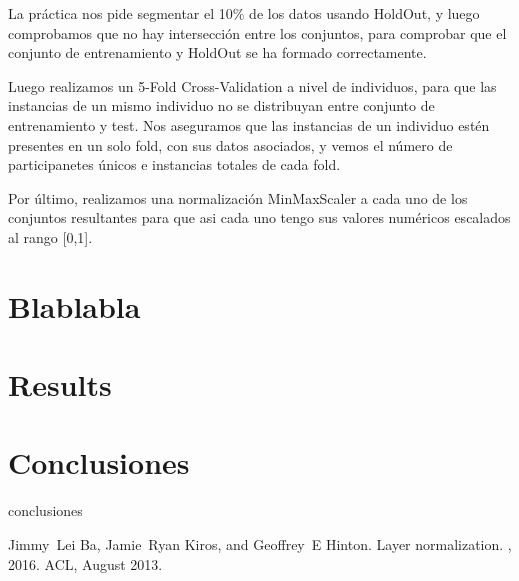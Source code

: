 \documentclass{article}
\begin{document}
La práctica nos pide segmentar el 10\% de los datos usando HoldOut, y luego comprobamos que no hay intersección entre los conjuntos, para comprobar que el conjunto de entrenamiento y HoldOut se ha formado correctamente. 

Luego realizamos un 5-Fold Cross-Validation a nivel de individuos, para que las instancias de un mismo individuo no se distribuyan entre conjunto de entrenamiento y test. Nos aseguramos que las instancias de un individuo estén presentes en un solo fold, con sus datos asociados, y vemos el número de participanetes únicos e instancias totales de cada fold.

Por último, realizamos una normalización MinMaxScaler a cada uno de los conjuntos resultantes para que asi cada uno tengo sus valores numéricos escalados al rango [0,1].
	\section{Blablabla}
	
	
	\section{Results} 
	
	
	\section{Conclusiones}
	
	conclusiones
	
	
	\begin{thebibliography}{10}
		
		Jimmy~Lei Ba, Jamie~Ryan Kiros, and Geoffrey~E Hinton.
		\newblock Layer normalization.
		, 2016.
		ACL, August 2013.
		
	\end{thebibliography}
	
\end{document}
